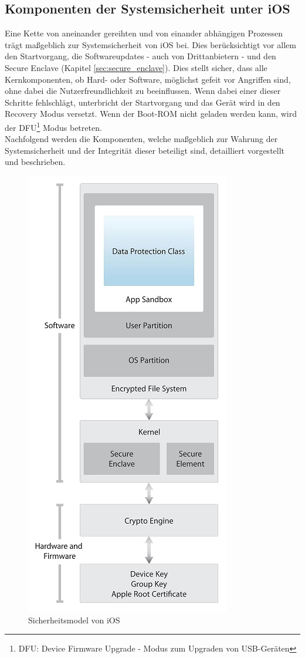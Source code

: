 \subsection{Komponenten der Systemsicherheit unter
iOS}\label{sec:components-syssec} 
	Eine Kette von aneinander gereihten und von einander abhängigen Prozessen trägt
	maßgeblich zur Systemsicherheit von iOS bei. Dies berücksichtigt vor allem den
	Startvorgang, die Softwareupdates - auch von Drittanbietern - und den Secure
	Enclave (Kapitel \ref{sec:secure_enclave}). Dies stellt sicher, dass
	alle Kernkomponenten, ob Hard- oder Software, möglichst gefeit vor Angriffen sind,
	ohne dabei die Nutzerfreundlichkeit zu beeinflussen. Wenn dabei einer dieser
	Schritte fehlschlägt, unterbricht der Startvorgang und das Gerät wird in den
	Recovery Modus versetzt. Wenn der Boot-ROM nicht geladen werden kann, wird der
	DFU\footnote{DFU: Device Firmware Upgrade - Modus zum Upgraden von USB-Geräten}
	Modus betreten.\\
	Nachfolgend werden die Komponenten, welche maßgeblich zur Wahrung der
	Systemsicherheit und der Integrität dieser beteiligt sind, detailliert
	vorgestellt und beschrieben.
	
	\begin{figure}[h]
		\centering
		\includegraphics[width=0.4\linewidth]{ios/media/security-model.jpg}
		\caption{Sicherheitsmodel von iOS 
		\cite[S.4]{iOSSecurityApr2015}}
		\label{fig:security-model}
	\end{figure}

